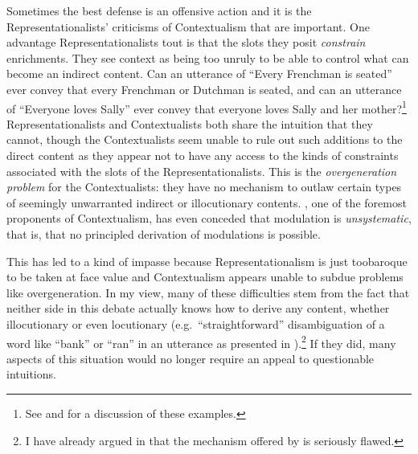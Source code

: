 Sometimes the best defense is an offensive action and it is the Representationalists' criticisms of Contextualism that are important. One advantage Representationalists tout is that the slots they posit \emph{constrain} enrichments. They see context as being too unruly to be able to control what can become an indirect content. Can an utterance of ``Every Frenchman is seated'' ever convey that every Frenchman or Dutchman is seated, and can an utterance of ``Everyone loves Sally'' ever convey that everyone loves Sally and her mother?\footnote{See \citet[Chapter~7]{stanley:lc} and \citet[Introduction]{recanati:tcp} for a discussion of these examples.} Representationalists and Contextualists both share the intuition that they cannot, though the Contextualists seem unable to rule out such additions to the direct content as they appear not to have any access to the kinds of constraints associated with the slots of the Representationalists. This is the \emph{overgeneration problem} for the Contextualists: they have no mechanism to outlaw certain types of seemingly unwarranted indirect or illocutionary contents. \citet{recanati:tcp}, one of the foremost proponents of Contextualism, has even conceded that modulation is \emph{unsystematic}, that is, that no principled derivation of modulations is possible.

This has led to a kind of impasse because Representationalism is just too\linebreak baroque to be taken at face value and Contextualism appears unable to subdue problems like overgeneration. In my view, many of these difficulties stem from the fact that neither side in this debate actually knows how to derive any content, whether illocutionary or even locutionary (e.g.\ ``straightforward'' disambiguation of a word like ``bank'' or ``ran'' in an utterance as presented in ).\footnote{I have already argued in  that the mechanism offered by  is seriously flawed.} If they did, many aspects of this situation would no longer require an appeal to questionable intuitions.

